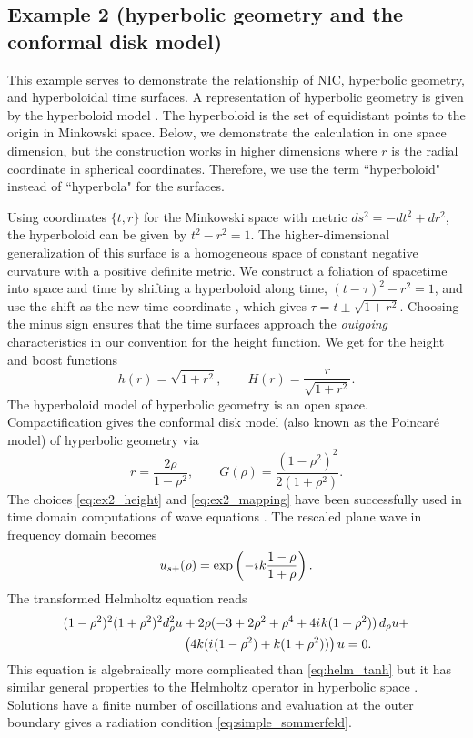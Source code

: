 \documentclass[onefignum,onetabnum]{siamart190516}
\newcommand{\be}{\begin{equation}}
\newcommand{\ee}{\end{equation}}
\newcommand{\iu}{{i\mkern1mu}}
\begin{document}
\subsection{Example 2 (hyperbolic geometry and the conformal disk model)}\label{sec:disk}
This example serves to demonstrate the relationship of NIC, hyperbolic geometry, and hyperboloidal time surfaces. A representation of hyperbolic geometry is given by the hyperboloid model \cite{thurston1979geometry, loustau2020hyperbolic}.  The hyperboloid is the set of equidistant points to the origin in Minkowski space. Below, we demonstrate the calculation in one space dimension, but the construction works in higher dimensions where $r$ is the radial coordinate in spherical coordinates. Therefore, we use the term ``hyperboloid" instead of ``hyperbola" for the surfaces. 

Using coordinates $\{t,r\}$ for the Minkowski space with metric $ds^2=-dt^2+dr^2$, the hyperboloid can be given by $t^2 - r^2 = 1$.
The higher-dimensional generalization of this surface is a homogeneous space of constant negative curvature with a positive definite metric. We construct a foliation of spacetime into space and time by shifting a hyperboloid along time, $(t-\tau)^2 - r^2 = 1$, and use the shift as the new time coordinate \cite{smarr_kinematical_1978, gowdy_wave_1981}, which gives $\tau = t \pm \sqrt{1+r^2}$. Choosing the minus sign ensures that the time surfaces approach the \emph{outgoing} characteristics in our convention for the height function. We get for the height and boost functions
\be \label{eq:ex2_height} h(r) = \sqrt{1+r^2}, \qquad H(r) = \frac{r}{\sqrt{1+r^2}}.\ee
The hyperboloid model of hyperbolic geometry is an open space. Compactification gives the conformal disk model (also known as the Poincar\'e model) of hyperbolic geometry via
\be\label{eq:ex2_mapping} r =  \frac{2\rho}{1-\rho^2}, \qquad G(\rho) = \frac{(1-\rho^2)^2}{2(1+\rho^2)}. \ee
The choices \eqref{eq:ex2_height} and \eqref{eq:ex2_mapping} have been successfully used in time domain computations of wave equations \cite{FodorRacz04, fodor2008numerical, Bizo__2009, ZenginogluKidder10}. The rescaled plane wave in frequency domain becomes 
\[ u_{s+}(\rho) = \exp\left(-\iu k \frac{1-\rho}{1+\rho}\right). \]
The transformed Helmholtz equation reads
\begin{align*} 
(1-\rho^2)^2 (1+\rho^2)^2 d_\rho^2 u &+ 2\rho (-3+2\rho^2+\rho^4 + 4\iu k (1+\rho^2) ) \,d_\rho u + \\
& \left( 4 k (\iu(1-\rho^2)+k(1+\rho^2))\right) u=0. 
\end{align*}
This equation is algebraically more complicated than \eqref{eq:helm_tanh} but it has similar general properties to the Helmholtz operator in hyperbolic space \cite{stoll2016harmonic}. Solutions have a finite number of oscillations and evaluation at the outer boundary gives a radiation condition \eqref{eq:simple_sommerfeld}.
\end{document}

